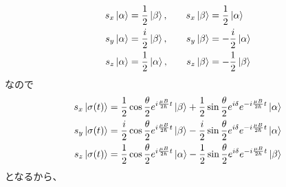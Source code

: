     \begin{alignat*}{2}
        s_x\ket{\alpha} &= \frac{1}{2}\ket{\beta}, &\quad s_x\ket{\beta} &= \frac{1}{2}\ket{\alpha}\\
        s_y\ket{\alpha} &= \frac{i}{2}\ket{\beta}, & s_y\ket{\beta} &= -\frac{i}{2}\ket{\alpha}\\
        s_z\ket{\alpha} &= \frac{1}{2}\ket{\alpha}, & s_z\ket{\beta} &= -\frac{1}{2}\ket{\beta}
    \end{alignat*}
    なので
    \begin{align*}
        s_x\ket{\sigma(t)} &= \frac{1}{2}\cos\frac{\theta}{2}e^{i\frac{\mu B}{2\hbar}t}\ket{\beta} + \frac{1}{2}\sin\frac{\theta}{2}e^{i\delta}e^{-i\frac{\mu B}{2\hbar}t}\ket{\alpha}\\
        s_y\ket{\sigma(t)} &= \frac{i}{2}\cos\frac{\theta}{2}e^{i\frac{\mu B}{2\hbar}t}\ket{\beta} - \frac{i}{2}\sin\frac{\theta}{2}e^{i\delta}e^{-i\frac{\mu B}{2\hbar}t}\ket{\alpha}\\
        s_z\ket{\sigma(t)} &= \frac{1}{2}\cos\frac{\theta}{2}e^{i\frac{\mu B}{2\hbar}t}\ket{\alpha} - \frac{1}{2}\sin\frac{\theta}{2}e^{i\delta}e^{-i\frac{\mu B}{2\hbar}t}\ket{\beta}
    \end{align*}
    となるから、

